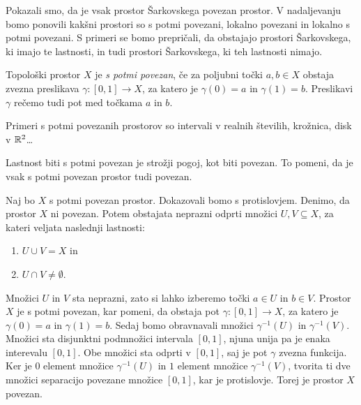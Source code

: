 \documentclass[../TG_magistrsko_delo_sections.tex]{subfiles}
\begin{document}
Pokazali smo, da je vsak prostor Šarkovskega povezan prostor. V nadaljevanju bomo ponovili kakšni prostori so s potmi povezani, lokalno povezani in lokalno s potmi povezani. S primeri se bomo prepričali, da obstajajo prostori Šarkovskega, ki imajo te lastnosti, in tudi prostori Šarkovskega, ki teh lastnosti nimajo.


\begin{definicija}
Topološki prostor $X$ je \emph{s potmi povezan}, če za poljubni točki $a, b \in X$ obstaja zvezna preslikava $\gamma:[0, 1] \to X$, za katero je $\gamma(0) = a$ in $\gamma(1) = b$. Preslikavi $\gamma$ rečemo tudi pot med točkama $a$ in $b$.
\end{definicija}

Primeri s potmi povezanih prostorov so intervali v realnih številih, krožnica, disk v $\mathbb R^2$\dots
\begin{trditev}
Lastnost biti s potmi povezan je strožji pogoj, kot biti povezan. To pomeni, da je vsak s potmi povezan prostor tudi povezan.
\end{trditev}

\begin{dokaz}
Naj bo $X$ s potmi povezan prostor. Dokazovali bomo s protislovjem. Denimo, da prostor $X$ ni povezan. Potem obstajata neprazni odprti množici $U, V \subseteq X$, za kateri veljata naslednji lastnosti:
\begin{enumerate}
\item $U \cup V = X$ in 
\item $U \cap V \neq \emptyset$.
\end{enumerate}
Množici $U$ in $V$ sta neprazni, zato si lahko izberemo točki $a\in U$ in $b\in V$. Prostor $X$ je s potmi povezan, kar pomeni, da obstaja pot $\gamma : [0, 1] \to X$, za katero je $\gamma(0) =a$ in $\gamma(1)=b$. Sedaj bomo obravnavali množici $\gamma^{-1}(U)$ in $\gamma^{-1}(V)$. Množici sta disjunktni podmnožici intervala $[0, 1]$, njuna unija pa je enaka interevalu $[0, 1]$. Obe množici sta odprti v $[0, 1]$, saj je pot $\gamma$ zvezna funkcija. Ker je $0$ element množice  $\gamma^{-1}(U)$ in $1$ element množice $\gamma^{-1}(V)$, tvorita ti dve množici separacijo povezane množice $[0, 1]$, kar je protislovje. Torej je prostor $X$ povezan.
\end{dokaz}
\end{document}
